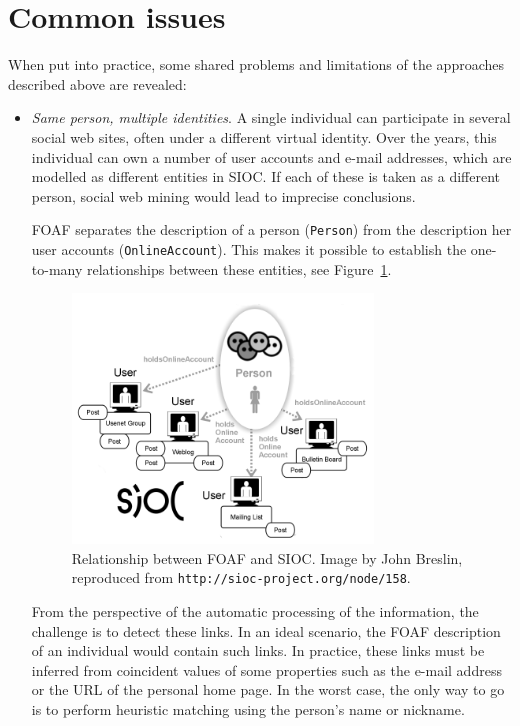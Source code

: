 \documentclass{../templates/www2008-submission}
\begin{document}
\section{Common issues}\label{sec:problems}

When put into practice, some shared problems and limitations
of the approaches described above are revealed:

\begin{itemize}
  \item \emph{Same person, multiple identities}. A single individual can
        participate in several social web sites, often under a different
        virtual identity. Over the years, this individual can own a
        number of user accounts and e-mail addresses, which are modelled
        as different entities in SIOC. If each of these is taken as
        a different person, social web mining would lead to imprecise
        conclusions.

        FOAF separates the description of a person
        (\texttt{Person})
        from the description her user accounts (\texttt{OnlineAccount}).
        This makes it possible to establish the one-to-many relationships
        between these entities, see Figure~\ref{fig:foaf-sioc}.

	\begin{figure}[t]
	 \centering
	 \includegraphics[width=8cm]{images/foaf-sioc.png}
	 \caption{\label{fig:foaf-sioc}Relationship between FOAF and SIOC. Image by John Breslin, reproduced from \texttt{http://sioc-project.org/node/158}.}
	\end{figure}

        From the perspective of the automatic processing of the
        information, the challenge is to detect these links. In an
        ideal scenario, the FOAF description of an individual would
        contain such links. In practice, these links must be
        inferred from coincident values of some properties such
        as the e-mail address or the URL of the personal home page.
        In the worst case, the only way to go is to perform heuristic matching
        using the person's name or nickname.


\end{itemize}
\end{document}
